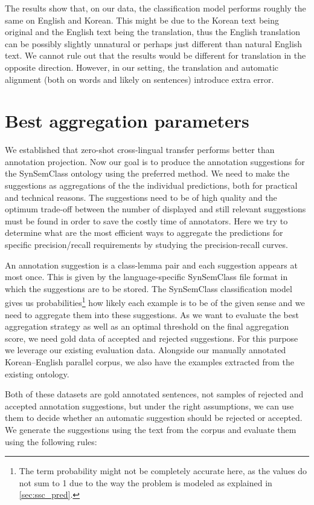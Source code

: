 The results show that, on our data, the classification model performs roughly the same on English and Korean. This might be due to the Korean text being original and the English text being the translation, thus the English translation can be possibly slightly unnatural or perhaps just different than natural English text. We cannot rule out that the results would be different for translation in the opposite direction. However, in our setting, the translation and automatic alignment (both on words and likely on sentences) introduce extra error.

\section{Best aggregation parameters}
\label{sec:aggregation_experiment}

We established that zero-shot cross-lingual transfer performs better than annotation projection. Now our goal is to produce the annotation suggestions for the SynSemClass ontology using the preferred method. We need to make the suggestions as aggregations of the the individual predictions, both for practical and technical reasons. The suggestions need to be of high quality and the optimum trade-off between the number of displayed and still relevant suggestions must be found in order to save the costly time of annotators. Here we try to determine what are the most efficient ways to aggregate the predictions for specific precision/recall requirements by studying the precision-recall curves.

An annotation suggestion is a class-lemma pair and each suggestion appears at most once. This is given by the language-specific SynSemClass file format in which the suggestions are to be stored. The SynSemClass classification model gives us probabilities\footnote{The term probability might not be completely accurate here, as the values do not sum to 1 due to the way the problem is modeled as explained in \cref{sec:ssc_pred}.} how likely each example is to be of the given sense and we need to aggregate them into these suggestions. As we want to evaluate the best aggregation strategy as well as an optimal threshold on the final aggregation score, we need gold data of accepted and rejected suggestions. For this purpose we leverage our existing evaluation data. Alongside our manually annotated Korean--English parallel corpus, we also have the examples extracted from the existing ontology.

Both of these datasets are gold annotated sentences, not samples of rejected and accepted annotation suggestions, but under the right assumptions, we can use them to decide whether an automatic suggestion should be rejected or accepted. We generate the suggestions using the text from the corpus and evaluate them using the following rules:

